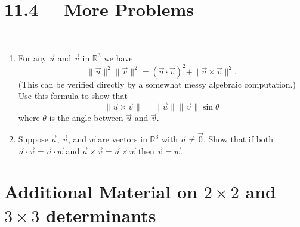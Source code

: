 \section*{11.4 \ \ More Problems}

\ 


\begin{enumerate}
\item  For any $\vec{u}$ and $\vec{v}$ in $\mathbb{R}^3$ we have 
\[
\| \vec{u} \|^2 \| \vec{v} \|^2 = (\vec{u} \cdot \vec{v})^2 + \| \vec{u} \times \vec{v} \|^2.
\]
(This can be verified directly by a somewhat messy algebraic computation.)  Use this formula to show that 
\[
\| \vec{u} \times \vec{v} \| = \| \vec{u} \| \| \vec{v} \| \sin \theta
\]
where $\theta$ is the angle between $\vec{u}$ and $\vec{v}$.  \\

\item  Suppose $\vec{a}$, $\vec{v}$, and $\vec{w}$ are vectors in $\mathbb{R}^3$ with $\vec{a} \neq \vec{0}$.  Show that if both $\vec{a} \cdot \vec{v} = \vec{a} \cdot \vec{w}$ and $\vec{a} \times \vec{v} = \vec{a} \times \vec{w}$ then $\vec{v} = \vec{w}$.  \\
\end{enumerate}


\section*{Additional Material on $2 \times 2$ and $3 \times 3$ determinants}

